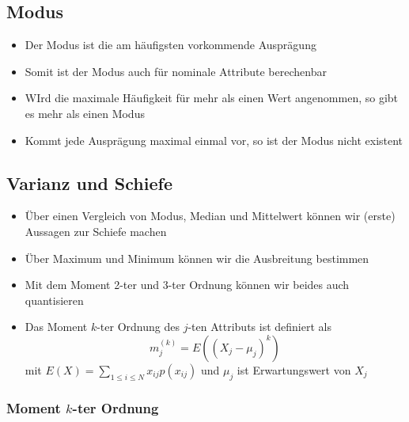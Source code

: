 \documentclass{scrartcl}
\begin{document}
\subsection{Modus}

\begin{itemize}
	\item Der Modus ist die am häufigsten vorkommende Ausprägung
	\item Somit ist der Modus auch für nominale Attribute berechenbar
	\item WIrd die maximale Häufigkeit für mehr als einen Wert angenommen, so 
	gibt es mehr als einen Modus
	\item Kommt jede Ausprägung maximal einmal vor, so ist der Modus nicht 
	existent
\end{itemize}

\subsection{Varianz und Schiefe}

\begin{itemize}
	\item Über einen Vergleich von Modus, Median und Mittelwert können wir 
	(erste) Aussagen zur Schiefe machen
	\item Über Maximum und Minimum können wir die Ausbreitung bestimmen
	\item Mit dem Moment 2-ter und 3-ter Ordnung können wir beides auch 
	quantisieren
	\item Das Moment $ k $-ter Ordnung des $ j $-ten Attributs ist definiert als
	\[ m_j^{(k)} = E((X_j - \mu_j)^k) \]
	mit $ E(X) = \sum_{1 \leq i \leq N} x_{ij} p(x_{ij}) $ und $ \mu_j $ ist 
	Erwartungswert von $ X_j $
\end{itemize}

\subsubsection{Moment $ k $-ter Ordnung}
\end{document}
